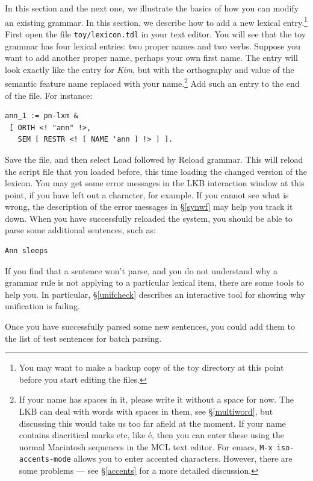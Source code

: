 \documentclass[12pt]{report}
\newcommand{\filename}[1]{{\tt #1}}
\newcommand{\lkbmenucommand}{{\bf}}
\begin{document}
In this section and the next one, we illustrate the basics of how you can
modify an existing grammar.
In this section, we describe how to add a new lexical entry.\footnote{You 
may want to make a backup copy of the toy
directory at this point before you start editing the files.}
First open the file \filename{toy/lexicon.tdl} in your text 
editor.
You will see that
the toy grammar has four lexical entries: two proper names and two verbs.
Suppose you want to add another proper name,
perhaps your own first name.  The entry will look exactly like
the entry for {\it Kim}, but with the orthography and value
of the semantic feature {\feature name} replaced with your name.\footnote{If your name
has spaces in it, please write it without a space for now.  
The LKB can deal with words with spaces in them, see \S\ref{multiword},
but discussing this would take us too far afield at the moment.  If your name contains
diacritical marks etc, like \'{e}, then you can enter these 
using the normal Macintosh sequences 
in the MCL text editor.  For emacs, {\tt M-x iso-accents-mode} allows
you to enter accented characters.  
However, there are some problems --- see \S\ref{accents} for a more
detailed discussion.}
Add such an entry to the end of the file.
For instance:
\begin{verbatim}
ann_1 := pn-lxm & 
 [ ORTH <! "ann" !>,
   SEM [ RESTR <! [ NAME 'ann ] !> ] ].
\end{verbatim}

Save the file, and then select {\lkbmenucommand Load}
followed by {\lkbmenucommand Reload grammar}.  This will reload the script file that
you loaded before, this time loading the changed version of the lexicon.
You may get some error messages in the LKB interaction window
at this point, if you have left
out a character, for example.  If you cannot see what is wrong, the
description of the error messages in \S\ref{synwf} may help you
track it down.  When you have successfully reloaded the system,
you should be able to parse some additional sentences, such as:
\begin{verbatim}
Ann sleeps
\end{verbatim}
If you find that a sentence won't parse, and you do not understand
why a grammar rule is not applying to a particular lexical
item, there are some tools to help you.  In particular,
\S\ref{unifcheck} describes an interactive tool for 
showing why unification is failing.

Once you have successfully parsed some new sentences,
you could add them to the list of test sentences for batch parsing.
\end{document}
